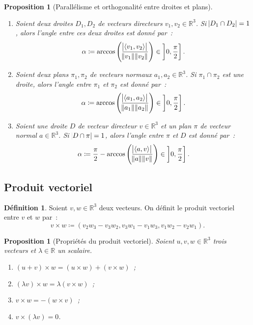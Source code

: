 \documentclass{article}
\newcommand{\R}{\mathbb R}
\newcommand{\scpr}[2]{\left\langle #1, #2\right\rangle}
\newtheorem{prp}[thm]{Proposition}
\theoremstyle{definition}
\newtheorem{déf}[thm]{Définition}
\theoremstyle{remark}
\begin{document}
		\begin{prp}[Parallélisme et orthogonalité entre droites et plans]~
		\begin{enumerate}
			\item Soient deux droites $D_1, D_2$ de vecteurs directeurs $v_1, v_2 \in \R^3$. Si $\abs{D_1 \cap D_2} = 1$, alors l'angle entre ces deux droites est
			      donné par~: \[\alpha \coloneqq \arccos\left(\frac {\abs {\scpr {v_1}{v_2}}}{\norm {v_1}\norm {v_2}}\right) \in \left]0, \frac \pi2\right].\]
			\item Soient deux plans $\pi_1, \pi_2$ de vecteurs normaux $a_1, a_2 \in \R^3$. Si $\pi_1 \cap \pi_2$ est une droite, alors l'angle entre $\pi_1$ et $\pi_2$
			      est donné par~: \[\alpha \coloneqq \arccos\left(\frac {\abs {\scpr {a_1}{a_2}}}{\norm {a_1}\norm {a_2}}\right) \in \left]0, \frac \pi2\right].\]
			\item Soient une droite $D$ de vecteur directeur $v \in \R^3$ et un plan $\pi$ de vecteur normal $a \in \R^3$. Si $\abs{D \cap \pi} = 1$, alors l'angle entre
			      $\pi$ et $D$ est donné par~: \[\alpha \coloneqq \frac \pi2 - \arccos\left(\frac {\abs {\scpr av}}{\norm a\norm v}\right) \in \left]0, \frac \pi2\right].\]
		\end{enumerate}
		\end{prp}

	\subsection{Produit vectoriel}
		\begin{déf} Soient $v, w \in \R^3$ deux vecteurs. On définit le produit vectoriel entre $v$ et $w$ par~:
		\[v \times w \coloneqq (v_2w_3 - v_3w_2, v_3w_1 - v_1w_3, v_1w_2 - v_2w_1).\] \end{déf}

		\begin{prp}[Propriétés du produit vectoriel] Soient $u, v, w \in \R^3$ trois vecteurs et $\lambda \in \R$ un scalaire.
		\begin{enumerate}
			\item $(u+v) \times w = (u \times w) + (v \times w)$~;
			\item $(\lambda v) \times w = \lambda (v \times w)$~;
			\item $v \times w = - (w \times v)$~;
			\item $v \times (\lambda v) = 0$.
		\end{enumerate}
		\end{prp}
\end{document}
